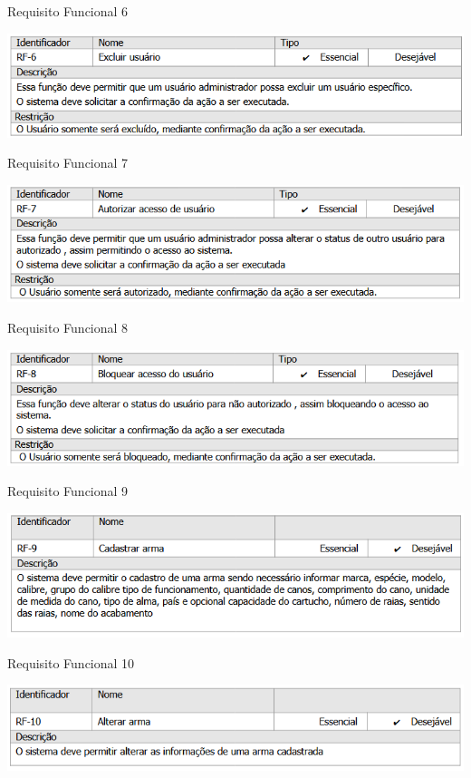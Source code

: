 \begin{table}[H]
    \caption{Requisito Funcional 6}\label{tab:rf06}
    \centering
    \includegraphics[scale=0.9]{imagens/rf06.png}
\end{table}
\begin{table}[H]
    \caption{Requisito Funcional 7}\label{tab:rf07}
    \centering
    \includegraphics[scale=0.9]{imagens/rf07.png}
\end{table}
\begin{table}[H]
    \caption{Requisito Funcional 8}\label{tab:rf08}
    \centering
    \includegraphics[scale=0.9]{imagens/rf08.png}
\end{table}
\begin{table}[H]
    \caption{Requisito Funcional 9}\label{tab:rf09}
    \centering
    \includegraphics[scale=0.9]{imagens/rf09.png}
\end{table}
\begin{table}[H]
    \caption{Requisito Funcional 10}\label{tab:rf10}
    \centering
    \includegraphics[scale=0.9]{imagens/rf10.png}
\end{table}
